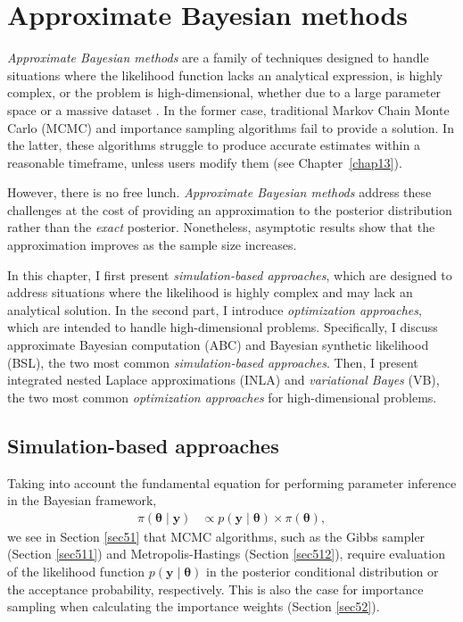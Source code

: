 \chapter{Approximate Bayesian methods}\label{chap15}

\textit{Approximate Bayesian methods} are a family of techniques designed to handle situations where the likelihood function lacks an analytical expression, is highly complex, or the problem is high-dimensional, whether due to a large parameter space or a massive dataset \cite{martin2024approximating}. In the former case, traditional Markov Chain Monte Carlo (MCMC) and importance sampling algorithms fail to provide a solution. In the latter, these algorithms struggle to produce accurate estimates within a reasonable timeframe, unless users modify them (see Chapter~\ref{chap13}).

However, there is no free lunch. \textit{Approximate Bayesian methods} address these challenges at the cost of providing an approximation to the posterior distribution rather than the \textit{exact} posterior. Nonetheless, asymptotic results show that the approximation improves as the sample size increases.

In this chapter, I first present \textit{simulation-based approaches}, which are designed to address situations where the likelihood is highly complex and may lack an analytical solution. In the second part, I introduce \textit{optimization approaches}, which are intended to handle high-dimensional problems. Specifically, I discuss approximate Bayesian computation (ABC) and Bayesian synthetic likelihood (BSL), the two most common \textit{simulation-based approaches}. Then, I present integrated nested Laplace approximations (INLA) and \textit{variational Bayes} (VB), the two most common \textit{optimization approaches} for high-dimensional problems.

\section{Simulation-based approaches}\label{sec15_1}
Taking into account the fundamental equation for performing parameter inference in the Bayesian framework,  
\begin{align*}
	\pi(\boldsymbol{\theta} \mid \mathbf{y}) & \propto p(\mathbf{y} \mid \boldsymbol{\theta}) \times \pi(\boldsymbol{\theta}),
\end{align*}  
we see in Section \ref{sec51} that MCMC algorithms, such as the Gibbs sampler (Section \ref{sec511}) and Metropolis-Hastings (Section \ref{sec512}), require evaluation of the likelihood function \( p(\boldsymbol{y} \mid \boldsymbol{\theta}) \) in the posterior conditional distribution or the acceptance probability, respectively. This is also the case for importance sampling when calculating the importance weights (Section \ref{sec52}).  

